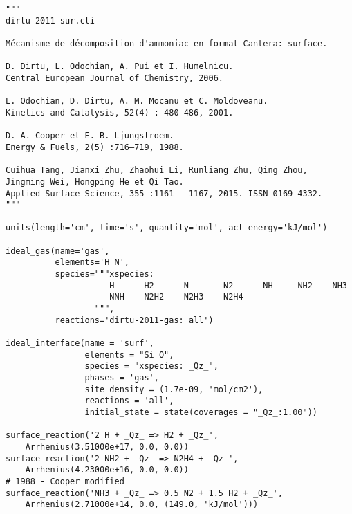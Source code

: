 \begin{verbatim}
"""
dirtu-2011-sur.cti

Mécanisme de décomposition d'ammoniac en format Cantera: surface.

D. Dirtu, L. Odochian, A. Pui et I. Humelnicu. 
Central European Journal of Chemistry, 2006.

L. Odochian, D. Dirtu, A. M. Mocanu et C. Moldoveanu. 
Kinetics and Catalysis, 52(4) : 480-486, 2001.

D. A. Cooper et E. B. Ljungstroem. 
Energy & Fuels, 2(5) :716–719, 1988.

Cuihua Tang, Jianxi Zhu, Zhaohui Li, Runliang Zhu, Qing Zhou,
Jingming Wei, Hongping He et Qi Tao. 
Applied Surface Science, 355 :1161 – 1167, 2015. ISSN 0169-4332.
"""

units(length='cm', time='s', quantity='mol', act_energy='kJ/mol')

ideal_gas(name='gas',
          elements='H N',
          species="""xspecies:
                     H      H2      N       N2      NH     NH2    NH3
                     NNH    N2H2    N2H3    N2H4
                  """,
          reactions='dirtu-2011-gas: all')

ideal_interface(name = 'surf',
                elements = "Si O",
                species = "xspecies: _Qz_",
                phases = 'gas',
                site_density = (1.7e-09, 'mol/cm2'),
                reactions = 'all',
                initial_state = state(coverages = "_Qz_:1.00"))

surface_reaction('2 H + _Qz_ => H2 + _Qz_',
    Arrhenius(3.51000e+17, 0.0, 0.0))
surface_reaction('2 NH2 + _Qz_ => N2H4 + _Qz_',
    Arrhenius(4.23000e+16, 0.0, 0.0))
# 1988 - Cooper modified
surface_reaction('NH3 + _Qz_ => 0.5 N2 + 1.5 H2 + _Qz_',
    Arrhenius(2.71000e+14, 0.0, (149.0, 'kJ/mol')))
\end{verbatim}

